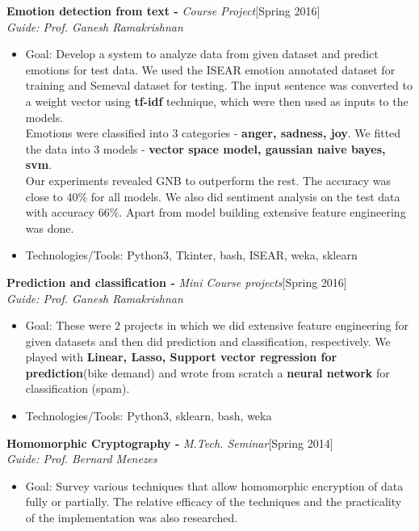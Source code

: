 \documentclass[a4paper,10pt]{article}
\begin{document}
\noindent
\textbf{Emotion detection from text -} \emph{Course Project}\hfill[Spring 2016] \\
\emph{Guide: Prof. Ganesh Ramakrishnan}
\begin{itemize}
 \item Goal: Develop a system to analyze data from given dataset and predict emotions for test data. We used the ISEAR emotion annotated dataset for training and Semeval dataset for testing. The input sentence was converted to a weight vector using \textbf{tf-idf} technique, which were then used as inputs to the models.\\
 Emotions were classified into 3 categories - \textbf{anger, sadness, joy}. We fitted the data into 3 models - \textbf{vector space model, gaussian naive bayes, svm}. \\Our experiments revealed GNB to outperform the rest. The accuracy was close to 40\% for all models. We also did sentiment analysis on the test data with accuracy 66\%. Apart from model building extensive feature engineering was done.
 \item Technologies/Tools: Python3, Tkinter, bash, ISEAR, weka, sklearn
\end{itemize}

\noindent
\textbf{Prediction and classification -} \emph{Mini Course projects}\hfill[Spring 2016] \\
\emph{Guide: Prof. Ganesh Ramakrishnan}
\begin{itemize}
	\item Goal: These were 2 projects in which we did extensive feature engineering for given datasets and then did prediction and classification, respectively. We played with \textbf{Linear, Lasso, Support vector regression for prediction}(bike demand) and wrote from scratch a \textbf{neural network} for classification (spam).
  \item Technologies/Tools: Python3, sklearn, bash, weka
\end{itemize}

\noindent
\textbf{Homomorphic Cryptography -} \emph{M.Tech. Seminar}\hfill[Spring 2014] \\
\emph{Guide: Prof. Bernard Menezes}
\begin{itemize}
 \item Goal: Survey various techniques that allow homomorphic encryption of data fully or partially. The relative efficacy of the techniques and the practicality of the implementation was also researched.
\end{itemize}
\end{document}
